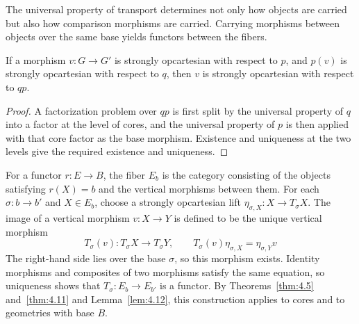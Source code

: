 The universal property of transport determines not only how objects are carried but also
how comparison morphisms are carried. Carrying morphisms between objects over the same
base yields functors between the fibers.

\begin{lemma}\label{lem:4.12}

If a morphism $v:G\to G'$ is strongly opcartesian with respect to $p$, and $p(v)$ is
strongly opcartesian with respect to $q$, then
$v$ is strongly opcartesian with respect to $qp$.

\end{lemma}

\begin{proof}

A factorization problem over $qp$ is first split by the universal property of $q$ into a
factor at the level of cores, and the universal property of $p$ is then applied with that
core factor as the base morphism.
Existence and uniqueness at the two levels give the required existence and uniqueness.

\end{proof}

\begin{construction}\label{cons:4.13}

For a functor $r:E\to B$, the fiber $E_b$ is the category consisting of the
objects satisfying $r(X)=b$ and the vertical morphisms between them.
For each $\sigma:b\to b'$ and $X\in E_b$, choose a strongly opcartesian lift
$\eta_{\sigma,X}:X\to T_\sigma X$.
The image of a vertical morphism $v:X\to Y$ is defined to be the unique vertical morphism
\begin{equation*}
T_\sigma(v):T_\sigma X\longrightarrow T_\sigma Y,\qquad
T_\sigma(v)\eta_{\sigma,X}=\eta_{\sigma,Y}v
\tag{4.13}\label{eq:4.13}
\end{equation*}
The right-hand side lies over the base $\sigma$, so this morphism exists.
Identity morphisms and composites of two morphisms satisfy the same equation, so
uniqueness shows that $T_\sigma:E_b\to E_{b'}$ is a functor.
By Theorems~\ref{thm:4.5} and~\ref{thm:4.11} and Lemma~\ref{lem:4.12}, this
construction applies to cores and to geometries with base $B$.

\end{construction}

